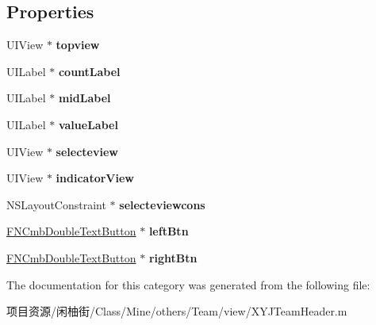 \subsection*{Properties}
\begin{DoxyCompactItemize}
\item 
\mbox{\label{category_x_y_j_team_header_07_08_a3c734ce108fba9b327057101a01d9053}} 
U\+I\+View $\ast$ {\bfseries topview}
\item 
\mbox{\label{category_x_y_j_team_header_07_08_aa4ba9fecfeff8700f4c33a34511f7a05}} 
U\+I\+Label $\ast$ {\bfseries count\+Label}
\item 
\mbox{\label{category_x_y_j_team_header_07_08_a0111a0a0d01e759ab8627cc5f8410b20}} 
U\+I\+Label $\ast$ {\bfseries mid\+Label}
\item 
\mbox{\label{category_x_y_j_team_header_07_08_a74201e07973af1f14be9ff480f33a12e}} 
U\+I\+Label $\ast$ {\bfseries value\+Label}
\item 
\mbox{\label{category_x_y_j_team_header_07_08_a6426c85d4aea2ee48ca23697a1a5c37c}} 
U\+I\+View $\ast$ {\bfseries selecteview}
\item 
\mbox{\label{category_x_y_j_team_header_07_08_a30f576ae227183314ee22aee5966c324}} 
U\+I\+View $\ast$ {\bfseries indicator\+View}
\item 
\mbox{\label{category_x_y_j_team_header_07_08_a388425992ef387750a2124327cf1db21}} 
N\+S\+Layout\+Constraint $\ast$ {\bfseries selecteviewcons}
\item 
\mbox{\label{category_x_y_j_team_header_07_08_a6490d3dcf984e825f306fe3c10d3b415}} 
\mbox{\hyperlink{interface_f_n_cmb_double_text_button}{F\+N\+Cmb\+Double\+Text\+Button}} $\ast$ {\bfseries left\+Btn}
\item 
\mbox{\label{category_x_y_j_team_header_07_08_ac5ff4d4af31528b788860b58775a81cc}} 
\mbox{\hyperlink{interface_f_n_cmb_double_text_button}{F\+N\+Cmb\+Double\+Text\+Button}} $\ast$ {\bfseries right\+Btn}
\end{DoxyCompactItemize}


The documentation for this category was generated from the following file\+:\begin{DoxyCompactItemize}
\item 
项目资源/闲柚街/\+Class/\+Mine/others/\+Team/view/X\+Y\+J\+Team\+Header.\+m\end{DoxyCompactItemize}
